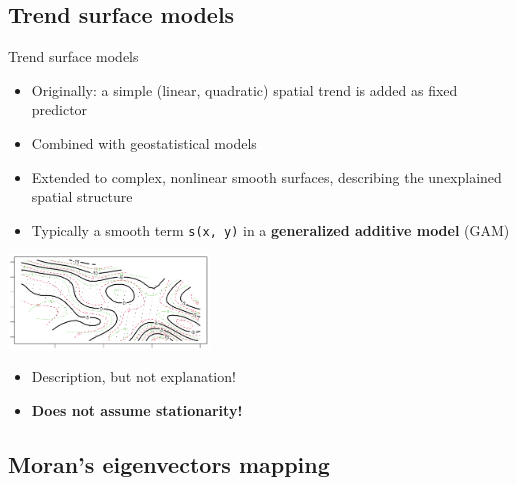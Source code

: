 \documentclass[
  ignorenonframetext,
]{beamer}
\providecommand{\tightlist}{%
  \setlength{\itemsep}{0pt}\setlength{\parskip}{0pt}}
\begin{document}
\hypertarget{trend-surface-models}{%
\subsection{Trend surface models}\label{trend-surface-models}}

\begin{frame}[fragile]{Trend surface models}
\small

\begin{itemize}
\item
  Originally: a simple (linear, quadratic) spatial trend is added as
  fixed predictor
\item
  Combined with geostatistical models
\item
  Extended to complex, nonlinear smooth surfaces, describing the
  unexplained spatial structure
\item
  Typically a smooth term \texttt{s(x,\ y)} in a \textbf{generalized
  additive model} (GAM)
\end{itemize}

\includegraphics[width=0.4\textwidth,height=\textheight]{spline_surf.png}

\begin{itemize}
\tightlist
\item
  Description, but not explanation!
\item
  \textbf{Does not assume stationarity!}
\end{itemize}
\end{frame}

\hypertarget{morans-eigenvectors-mapping}{%
\subsection{Moran's eigenvectors
mapping}\label{morans-eigenvectors-mapping}}
\end{document}
